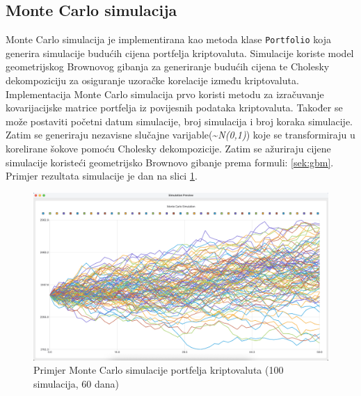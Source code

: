 \documentclass[zavrsnirad]{fer}
\begin{document}
\subsection{Monte Carlo simulacija}
\label{sek:monte_carlo_simulacija}
Monte Carlo simulacija je implementirana kao metoda klase
\texttt{Portfolio} koja generira simulacije budućih cijena portfelja
kriptovaluta. Simulacije koriste model geometrijskog Brownovog gibanja
za generiranje budućih cijena te Cholesky dekompoziciju za
osiguranje uzoračke korelacije između kriptovaluta.
Implementacija Monte Carlo simulacija prvo koristi metodu za izračuvanje
kovarijacijske matrice portfelja iz povijesnih podataka kriptovaluta.
Također se može postaviti početni datum simulacije, broj simulacija i
broj koraka simulacije.
Zatim se generiraju nezavisne slučajne varijable(\textasciitilde \textit{N(0,1)}) koje se
transformiraju u korelirane šokove pomoću Cholesky dekompozicije.
Zatim se ažuriraju cijene simulacije koristeći geometrijsko Brownovo gibanje
prema formuli:
\ref{sek:gbm}. Primjer rezultata simulacije je dan na slici
\ref{fig:monte_carlo_example}.
\begin{figure}[ht]
    \centering
    \includegraphics[width=1.5\textwidth]{Figures/monte_carlo_example.png}
    \caption{Primjer Monte Carlo simulacije portfelja kriptovaluta (100
    simulacija, 60 dana)}
    \label{fig:monte_carlo_example}
\end{figure}
\end{document}
